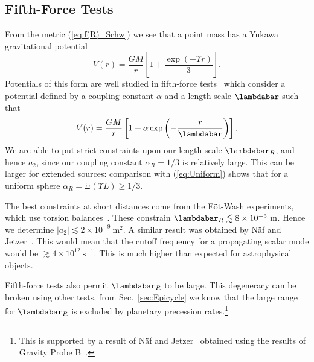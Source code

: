 \documentclass[aps,prd,amsfonts,amssymb,amsmath,nofootinbib,reprint,showpacs]{revtex4-1}
\newcommand{\eqnref}[1]{(\ref{eq:#1})}
\newcommand{\secref}[1]{Sec.\ \ref{sec:#1}}
\newcommand{\units}[1]{\ensuremath{~\mathrm{#1}}}
\begin{document}
\subsection{Fifth-Force Tests\label{sec:Fifth}}

From the metric \eqnref{f(R)_Schw} we see that a point mass has a Yukawa gravitational potential~\cite{Stelle1978, Capozziello2009a, Naf2010}
\begin{equation}
V(r) = \frac{GM}{r}\left[1 + \frac{\exp(- \Upsilon r)}{3}\right].
\end{equation}
Potentials of this form are well studied in fifth-force tests~\cite{Will2006, Adelberger2009, Adelberger2003} which consider a potential defined by a coupling constant $\alpha$ and a length-scale $\lambdabar$ such that
\begin{equation}
V(r) = \frac{GM}{r}\left[1 + \alpha\exp\left(-\frac{r}{\lambdabar}\right)\right].
\end{equation}
We are able to put strict constraints upon our length-scale $\lambdabar_R$, and hence $a_2$, since our coupling constant $\alpha_R = 1/3$ is relatively large. This can be larger for extended sources: comparison with \eqnref{Uniform} shows that for a uniform sphere $\alpha_R = \Xi(\Upsilon L) \geq 1/3$.

The best constraints at short distances come from the E\"{o}t-Wash experiments, which use torsion balances~\cite{Kapner2007a, Hoyle2004}. These constrain $\lambdabar_R \lesssim 8\times 10^{-5}\units{m}$. Hence we determine $|a_2| \lesssim 2 \times 10^{-9}\units{m^2}$. A similar result was obtained by N\"{a}f and Jetzer~\cite{Naf2010}. This would mean that the cutoff frequency for a propagating scalar mode would be $\gtrsim 4 \times 10^{12}\units{s^{-1}}$. This is much higher than expected for astrophysical objects.

Fifth-force tests also permit $\lambdabar_R$ to be large. This degeneracy can be broken using other tests, from \secref{Epicycle} we know that the large range for $\lambdabar_R$ is excluded by planetary precession rates.\footnote{This is supported by a result of N\"{a}f and Jetzer~\cite{Naf2010} obtained using the results of Gravity Probe B~\cite{Everitt2009}.}
\end{document}
